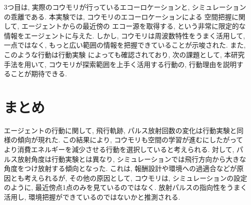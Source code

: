 \documentclass[../main]{subfiles}
\begin{document}
3つ目は, 実際のコウモリが行っているエコーロケーションと, 
シミュレーションの乖離である.
本実験では, コウモリのエコーロケーションによる
空間把握に関して, エージェントからの最近傍の
エコー源を取得する, という非常に限定的な情報をエージェントに与えた.
しかし, コウモリは周波数特性をうまく活用して, 
一点ではなく, もっと広い範囲の情報を把握できていることが示唆された.
また, このような行動は行動実験\cite{ref:miwasan}
によっても確認されており, 
次の課題として, 本研究手法を用いて, 
コウモリが探索範囲を上手く活用する行動の, 
行動理由を説明することが期待できる.


\section{まとめ}
エージェントの行動に関して, 飛行軌跡, 
パルス放射回数の変化は行動実験と同様の傾向が現れた.
この結果により,
コウモリも空間の学習が進むにしたがって
より消費エネルギーを減少させる行動を選択していると考えられる.
対して, パルス放射角度は行動実験とは異なり, 
シミュレーションでは飛行方向から大きな角度をつけ放射する傾向となった.
これは, 報酬設計や環境への過適合などが原因とも考えられるが, 
その他の原因として, コウモリは, シミュレーションの設定のように, 
最近傍点1点のみを見ているのではなく.
放射パルスの指向性をうまく活用し, 
環境把握ができているのではないかと推測される.

    
\end{document}
